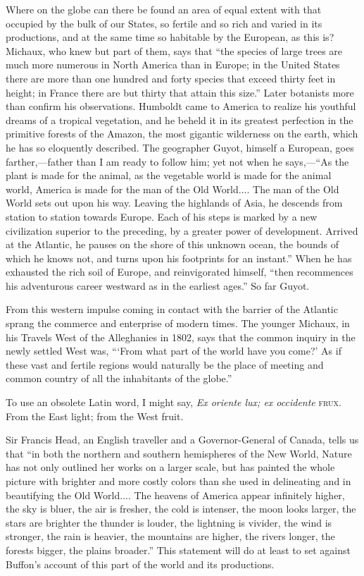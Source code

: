 \documentclass[twoside,openright,10pt]{memoir} %
\begin{document}
Where on the globe can there be found an area of equal extent with that occupied by the bulk of our States, so fertile and so rich and varied in its productions, and at the same time so habitable by the European, as this is? Michaux, who knew but part of them, says that “the species of large trees are much more numerous in North America than in Europe; in the United States there are more than one hundred and forty species that exceed thirty feet in height; in France there are but thirty that attain this size.” Later botanists more than confirm his observations. Humboldt came to America to realize his youthful dreams of a tropical vegetation, and he beheld it in its greatest perfection in the primitive forests of the Amazon, the most gigantic wilderness on the earth, which he has so eloquently described. The geographer Guyot, himself a European, goes farther,—father than I am ready to follow him; yet not when he says,—“As the plant is made for the animal, as the vegetable world is made for the animal world, America is made for the man of the Old World.... The man of the Old World sets out upon his way. Leaving the highlands of Asia, he descends from station to station towards Europe. Each of his steps is marked by a new civilization superior to the preceding, by a greater power of development. Arrived at the Atlantic, he pauses on the shore of this unknown ocean, the bounds of which he knows not, and turns upon his footprints for an instant.” When he has exhausted the rich soil of Europe, and reinvigorated himself, “then recommences his adventurous career westward as in the earliest ages.” So far Guyot.

From this western impulse coming in contact with the barrier of the Atlantic sprang the commerce and enterprise of modern times. The younger Michaux, in his Travels West of the Alleghanies in 1802, says that the common inquiry in the newly settled West was, “‘From what part of the world have you come?’ As if these vast and fertile regions would naturally be the place of meeting and common country of all the inhabitants of the globe.”

To use an obsolete Latin word, I might say, \emph{Ex oriente lux; ex occidente} \textsc{frux}. From the East light; from the West fruit.

Sir Francis Head, an English traveller and a Governor-General of Canada, tells us that “in both the northern and southern hemispheres of the New World, Nature has not only outlined her works on a larger scale, but has painted the whole picture with brighter and more costly colors than she used in delineating and in beautifying the Old World.... The heavens of America appear infinitely higher, the sky is bluer, the air is fresher, the cold is intenser, the moon looks larger, the stars are brighter the thunder is louder, the lightning is vivider, the wind is stronger, the rain is heavier, the mountains are higher, the rivers longer, the forests bigger, the plains broader.” This statement will do at least to set against Buffon’s account of this part of the world and its productions.
\end{document}
